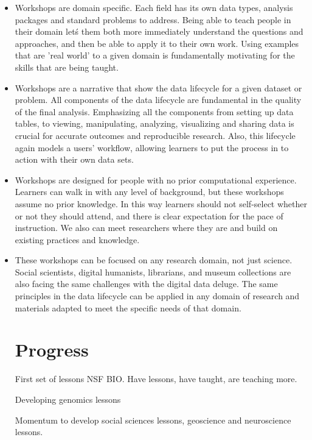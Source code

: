 \documentclass[15]{idcc}
\begin{document}
\begin{itemize}
\item Workshops are domain specific. Each field has its own data types, analysis packages and standard problems to address. Being able to teach people in their domain let\'s them both more immediately understand the questions and approaches, and then be able to apply it to their own work. Using examples that are 'real world' to a given domain is fundamentally motivating for the skills that are being taught.

\item Workshops are a narrative that show the data lifecycle for a given dataset or problem. All components of the data lifecycle are fundamental in the quality of the final analysis. Emphasizing all the components from setting up data tables, to viewing, manipulating, analyzing, visualizing and sharing data is crucial for accurate outcomes and reproducible research. Also, this lifecycle again models a users' workflow, allowing learners to put the process in to action with their own data sets.

\item Workshops are designed for people with no prior computational experience. Learners can walk in with any level of background, but these workshops assume no prior knowledge. In this way learners should not self-select whether or not they should attend, and there is clear expectation for the pace of instruction. We also can meet researchers where they are and build on existing practices and knowledge.

\item These workshops can be focused on any research domain, not just science. Social scientists, digital humanists, librarians, and museum collections are also facing the same challenges with the digital data deluge. The same principles in the data lifecycle can be applied in any domain of research and materials adapted to meet the specific needs of that domain.



\section{Progress}

First set of lessons NSF BIO. Have lessons, have taught, are teaching more.

Developing genomics lessons

Momentum to develop social sciences lessons, geoscience and neuroscience lessons.


\end{itemize}
\end{document}
